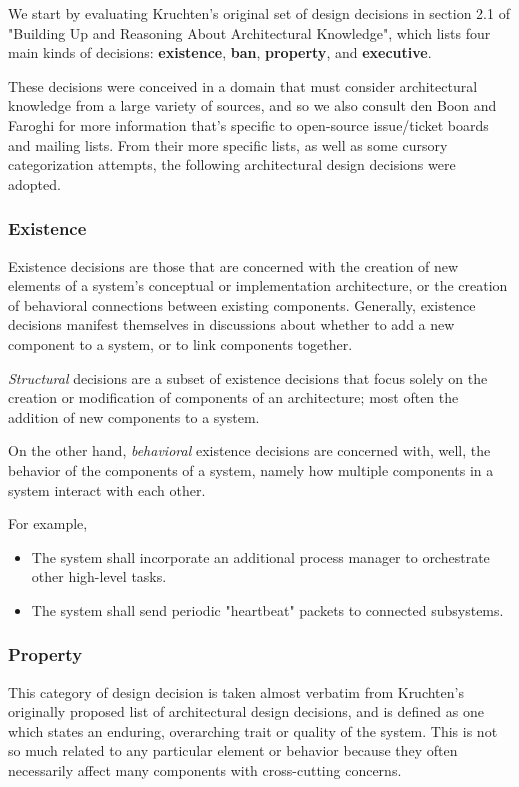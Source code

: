\documentclass[a4paper, 12pt]{article}
\begin{document}
		We start by evaluating Kruchten's original set of design decisions in section 2.1 of "Building Up and Reasoning About Architectural Knowledge"\autocite{kruchten}, which lists four main kinds of decisions: \textbf{existence}, \textbf{ban}, \textbf{property}, and \textbf{executive}.
	
		These decisions were conceived in a domain that must consider architectural knowledge from a large variety of sources, and so we also consult den Boon\autocite{denboon} and Faroghi\autocite{faroghi} for more information that's specific to open-source issue/ticket boards and mailing lists. From their more specific lists, as well as some cursory categorization attempts, the following architectural design decisions were adopted.
		
		\subsubsection{\textbf{Existence}}
			Existence decisions are those that are concerned with the creation of new elements of a system's conceptual or implementation architecture, or the creation of behavioral connections between existing components. Generally, existence decisions manifest themselves in discussions about whether to add a new component to a system, or to link components together.
			
			\textit{Structural} decisions are a subset of existence decisions that focus solely on the creation or modification of components of an architecture; most often the addition of new components to a system.
			
			On the other hand, \textit{behavioral} existence decisions are concerned with, well, the behavior of the components of a system, namely how multiple components in a system interact with each other.
			
			For example,
			\begin{itemize}
				\item The system shall incorporate an additional process manager to orchestrate other high-level tasks.
				\item The system shall send periodic "heartbeat" packets to connected subsystems.
			\end{itemize}
			
		\subsubsection{\textbf{Property}}
			This category of design decision is taken almost verbatim from Kruchten's originally proposed list of architectural design decisions\autocite{kruchten}, and is defined as one which states an enduring, overarching trait or quality of the system. This is not so much related to any particular element or behavior because they often necessarily affect many components with cross-cutting concerns.
			
\end{document}
